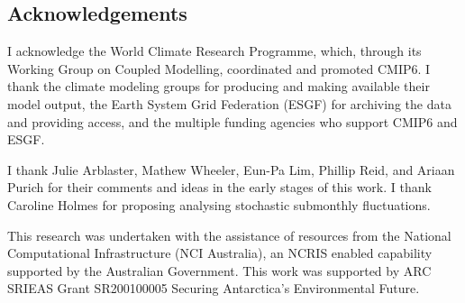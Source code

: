 \documentclass[tc, manuscript]{copernicus}
\begin{document}





\begin{acknowledgements}
\section{Acknowledgements}\label{acknowledgements}

I acknowledge the World Climate Research Programme, which, through its
Working Group on Coupled Modelling, coordinated and promoted CMIP6. I
thank the climate modeling groups for producing and making available
their model output, the Earth System Grid Federation (ESGF) for
archiving the data and providing access, and the multiple funding
agencies who support CMIP6 and ESGF.

I thank Julie Arblaster, Mathew Wheeler, Eun-Pa Lim, Phillip Reid, and
Ariaan Purich for their comments and ideas in the early stages of this
work. I thank Caroline Holmes for proposing analysing stochastic
submonthly fluctuations.

This research was undertaken with the assistance of resources from the
National Computational Infrastructure (NCI Australia), an NCRIS enabled
capability supported by the Australian Government. This work was
supported by ARC SRIEAS Grant SR200100005 Securing Antarctica's
Environmental Future.
\end{acknowledgements}



\end{document}
